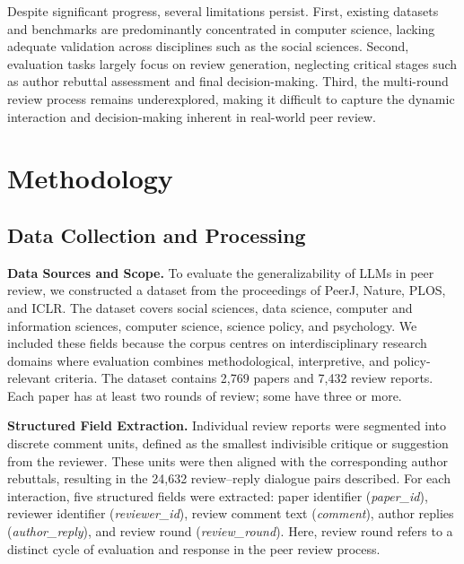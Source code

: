 \documentclass[preprint,10pt,times]{elsarticle}
\begin{document}
Despite significant progress, several limitations persist. First, existing datasets and benchmarks are predominantly concentrated in computer science, lacking adequate validation across disciplines such as the social sciences. Second, evaluation tasks largely focus on review generation, neglecting critical stages such as author rebuttal assessment and final decision-making. Third, the multi-round review process remains underexplored, making it difficult to capture the dynamic interaction and decision-making inherent in real-world peer review.

\section{Methodology}
\label{sec:method}

\subsection{Data Collection and Processing}
\label{sec:data}

\textbf{Data Sources and Scope.} To evaluate the generalizability of LLMs in peer review, we constructed a dataset from the proceedings of PeerJ, Nature, PLOS, and ICLR. The dataset covers social sciences, data science, computer and information sciences, computer science, science policy, and psychology. We included these fields because the corpus centres on interdisciplinary research domains where evaluation combines methodological, interpretive, and policy-relevant criteria. The dataset contains 2,769 papers and 7,432 review reports. Each paper has at least two rounds of review; some have three or more.

\textbf{Structured Field Extraction.} Individual review reports were segmented into discrete comment units, defined as the smallest indivisible critique or suggestion from the reviewer. These units were then aligned with the corresponding author rebuttals, resulting in the 24,632 review--reply dialogue pairs described. For each interaction, five structured fields were extracted: paper identifier (\textit{paper\_id}), reviewer identifier (\textit{reviewer\_id}), review comment text (\textit{comment}), author replies (\textit{author\_reply}), and review round (\textit{review\_round}). Here, review round refers to a distinct cycle of evaluation and response in the peer review process.
\end{document}
